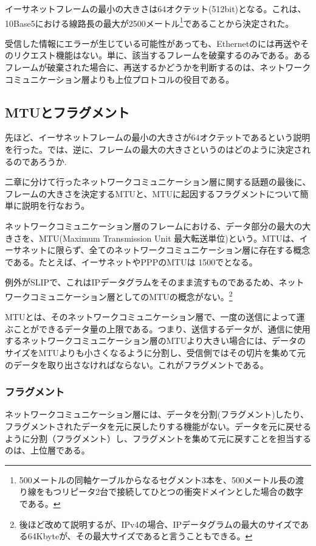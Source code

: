 イーサネットフレームの最小の大きさは64オクテット(512bit)となる。これは、10Base5における線路長の最大が2500メートル\footnote{500メートルの同軸ケーブルからなるセグメント3本を、500メートル長の渡り線をもつリピータ2台で接続してひとつの衝突ドメインとした場合の数字である。}であることから決定された。


受信した情報にエラーが生じている可能性があっても、Ethernetのには再送やそのリクエスト機能はない。単に、該当するフレームを破棄するのみである。あるフレームが破棄された場合に、再送するかどうかを判断するのは、ネットワークコミュニケーション層よりも上位プロトコルの役目である。

\subsection{MTUとフラグメント}

先ほど、イーサネットフレームの最小の大きさが64オクテットであるという説明を行った。では、逆に、フレームの最大の大きさというのはどのように決定されるのであろうか. 

二章に分けて行ったネットワークコミュニケーション層に関する話題の最後に、フレームの大きさを決定するMTUと、MTUに起因するフラグメントについて簡単に説明を行なおう。

ネットワークコミュニケーション層のフレームにおける、データ部分の最大の大きさを、MTU(Maximum Transmission Unit 最大転送単位)という。MTUは、イーサネットに限らず、全てのネットワークコミュニケーション層に存在する概念である。たとえば、イーサネットやPPPのMTUは 1500でとなる。

例外がSLIPで、これはIPデータグラムをそのまま流すものであるため、ネットワークコミュニケーション層としてのMTUの概念がない。\footnote{後ほど改めて説明するが、IPv4の場合、IPデータグラムの最大のサイズである64Kbyteが、その最大サイズであると言うこともできる。}

MTUとは、そのネットワークコミュニケーション層で、一度の送信によって運ぶことができるデータ量の上限である。つまり、送信するデータが、通信に使用するネットワークコミュニケーション層のMTUより大きい場合には、データのサイズをMTUよりも小さくなるように分割し、受信側ではその切片を集めて元のデータを取り出さなければならない。これがフラグメントである。

\subsubsection{フラグメント}
ネットワークコミュニケーション層には、データを分割(フラグメント)したり、フラグメントされたデータを元に戻したりする機能がない。データを元に戻せるように分割（フラグメント）し、フラグメントを集めて元に戻すことを担当するのは、上位層である。

